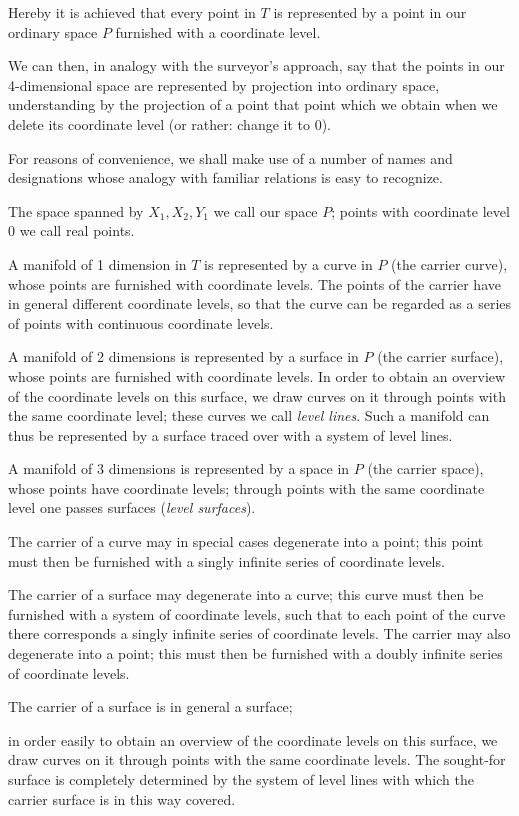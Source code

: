 \documentclass{article}
\begin{document}
Hereby it is achieved that every point in $T$ is represented by a point in our ordinary space $P$ furnished with a coordinate level.

We can then, in analogy with the surveyor's approach, say that the points in our 4-dimensional space are represented by projection into ordinary space, understanding by the projection of a point that point which we obtain when we delete its coordinate level (or rather: change it to 0).

For reasons of convenience, we shall make use of a number of names and designations whose analogy with familiar relations is easy to recognize.

The space spanned by $X_1, X_2, Y_1$ we call our space $P$; points with coordinate level 0 we call real points.

A manifold of 1 dimension in $T$ is represented by a curve in $P$ (the carrier curve), whose points are furnished with coordinate levels. The points of the carrier have in general different coordinate levels, so that the curve can be regarded as a series of points with continuous coordinate levels.

A manifold of 2 dimensions is represented by a surface in $P$ (the carrier surface), whose points are furnished with coordinate levels. In order to obtain an overview of the coordinate levels on this surface, we draw curves on it through points with the same coordinate level; these curves we call \emph{level lines}. Such a manifold can thus be represented by a surface traced over with a system of level lines.

A manifold of 3 dimensions is represented by a space in $P$ (the carrier space), whose points have coordinate levels; through points with the same coordinate level one passes surfaces (\emph{level surfaces}).

The carrier of a curve may in special cases degenerate into a point; this point must then be furnished with a singly infinite series of coordinate levels.

The carrier of a surface may degenerate into a curve; this curve must then be furnished with a system of coordinate levels, such that to each point of the curve there corresponds a singly infinite series of coordinate levels. The carrier may also degenerate into a point; this must then be furnished with a doubly infinite series of coordinate levels.

The carrier of a surface is in general a surface;

in order easily to obtain an overview of the coordinate levels on this surface, we draw curves on it through points with the same coordinate levels. The sought-for surface is completely determined by the system of level lines with which the carrier surface is in this way covered.
\end{document}
